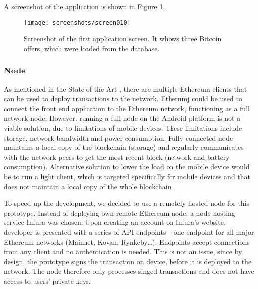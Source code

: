 A screenshot of the application is shown in Figure \ref{fig:app-screenshot}.

\begin{figure}[ht]
    \centering
    \texttt{[image: screenshots/screen010]}
    \caption{Screenshot of the first application screen. It whows three Bitcoin offers, which were loaded from the database.}
    \label{fig:app-screenshot}
\end{figure}
% 
% 
% 
% 
\subsubsection{Node}
As mentioned in the State of the Art \pageref{sec:eth-clients}, there are multiple Ethereum clients that can be used to deploy transactions to the network. Etherumj could be used to connect the front end application to the Ethereum network, functioning as a full network node. However, running a full node on the Android platform is not a viable solution, due to limitations of mobile devices. These limitations include storage, network bandwidth and power consumption\footnotemark.%
% 
Fully connected node maintains a local copy of the blockchain (storage) and regularly communicates with the network peers to get the most recent block (network and battery consumption). Alternative solution to lower the load on the mobile device would be to run a light client\footnotemark, which is targeted specifically for mobile devices and that does not maintain a local copy of the whole blockchain.
% 

To speed up the development, we decided to use a remotely hosted node for this prototype. Instead of deploying own remote Ethereum node, a node-hosting service Infura was chosen. Upon creating an account on Infura’s website, developer is presented with a series of API endpoints – one endpoint for all major Ethereum networks (Mainnet, Kovan, Rynkeby…). Endpoints accept connections from any client and no authentication is needed. This is not an issue, since by design, the prototype signs the transaction on device, before it is deployed to the network. The node therefore only processes singed transactions and does not have access to users' private keys.

